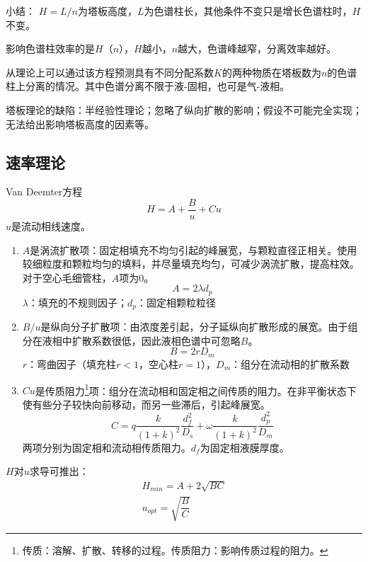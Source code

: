 小结：
$H=L/n$为塔板高度，$L$为色谱柱长，其他条件不变只是增长色谱柱时，$H$不变。

影响色谱柱效率的是$H$（$n$），$H$越小，$n$越大，色谱峰越窄，分离效率越好。

从理论上可以通过该方程预测具有不同分配系数$K$的两种物质在塔板数为$n$的色谱柱上分离的情况。其中色谱分离不限于液-固相，也可是气-液相。

塔板理论的缺陷：半经验性理论；忽略了纵向扩散的影响；假设不可能完全实现；无法给出影响塔板高度的因素等。

\subsection{速率理论}

\begin{theorem*}{Van Deemter方程}{}
	\begin{equation*}
		H=A+\dfrac{B}{u}+Cu
	\end{equation*}
	$u$是流动相线速度。
\end{theorem*}

\begin{enumerate}
	\item $A$是涡流扩散项：固定相填充不均匀引起的峰展宽，与颗粒直径正相关。使用较细粒度和颗粒均匀的填料，并尽量填充均匀，可减少涡流扩散，提高柱效。对于空心毛细管柱，$A$项为$0$。
	\begin{equation*}
		A=2\lambda d_p
	\end{equation*}
	$\lambda$：填充的不规则因子；$d_p$：固定相颗粒粒径
	\item $B/u$是纵向分子扩散项：由浓度差引起，分子延纵向扩散形成的展宽。由于组分在液相中扩散系数很低，因此液相色谱中可忽略$B$。
	\begin{equation*}
		B=2rD_m
	\end{equation*}
	$r$：弯曲因子（填充柱$r<1$，空心柱$r=1$），$D_m$：组分在流动相的扩散系数
	\item $Cu$是传质阻力\footnote{传质：溶解、扩散、转移的过程。传质阻力：影响传质过程的阻力。}项：组分在流动相和固定相之间传质的阻力。在非平衡状态下使有些分子较快向前移动，而另一些滞后，引起峰展宽。
	\begin{equation*}
		C=q\dfrac{k}{(1+k)^2}\dfrac{d_f^2}{D_s}+\omega\dfrac{k}{(1+k)^2}\dfrac{d_p^2}{D_m}
	\end{equation*}
	两项分别为固定相和流动相传质阻力。$d_f$为固定相液膜厚度。
\end{enumerate}

$H$对$u$求导可推出：
\begin{gather*}
	H_{min}=A+2\sqrt{BC}\\
	u_{opt}=\sqrt{\dfrac{B}{C}}
\end{gather*}


